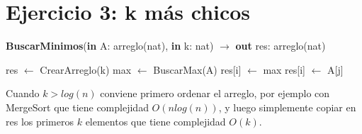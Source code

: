 \section{Ejercicio 3: k más chicos}

\begin{algorithm}[H]
\caption{
    \textbf{BuscarMinimos}(\textbf{in} A: arreglo(nat), \textbf{in} k: nat) $\to$ \textbf{out} res: arreglo(nat)
}
\begin{algorithmic}[1]
    \State res $\gets$ CrearArreglo(k) 
    \State max $\gets$ BuscarMax(A) 
     
        \State res[i] $\gets$ max
    \EndFor
     
         
                \State res[i] $\gets$ A[j]
            \EndIf
        \EndFor
    \EndFor
\end{algorithmic}
\end{algorithm}

Cuando $k > log(n)$ conviene primero ordenar el arreglo, por ejemplo con MergeSort que tiene complejidad $O(n log(n))$, y luego simplemente copiar en res los primeros $k$ elementos que tiene complejidad $O(k)$.
